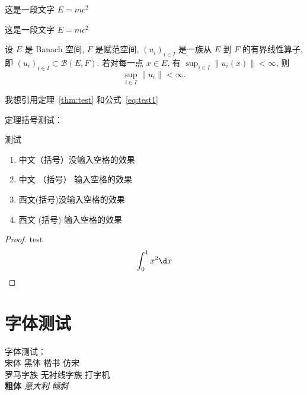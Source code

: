 \documentclass[class = professional, oneside]{gdufe_master_thesis}
\begin{document}
\begin{lemm}
    这是一段文字 $E = m c^2$
\end{lemm}


\begin{rema}
    这是一段文字 $E = m c^2$
\end{rema}

\begin{theo}\label{thm:test}
    设 $E$ 是 Banach 空间, $F$ 是赋范空间, $(u_i)_{i\in I}$ 是一族从 $E$ 到 $F$ 的有界线性算子,
    即 $(u_i)_{i\in I}\subset \mathcal{B}(E,F)$. 若对每一点 $x\in E$, 有
    $\sup_{i\in I} \|u_i(x)\|<\infty$, 则
    \begin{equation}\label{eq:test1}
        \sup_{i\in I} \|u_i\| < \infty.
    \end{equation}
\end{theo}

我想引用定理~\ref{thm:test} 和公式~\ref{eq:test1}


定理括号测试：

\begin{theo}
    测试
    \begin{enumerate}
        \item 中文（括号）没输入空格的效果
        \item 中文 （括号） 输入空格的效果
        \item 西文(括号)没输入空格的效果
        \item 西文 (括号) 输入空格的效果
    \end{enumerate}
\end{theo}


\begin{proof}
    test
    \[
        \int_{0}^{1} x^2 \d x
    \]
\end{proof}



\section{字体测试}
字体测试：\\
{宋体} {\heiti 黑体} {\kaishu 楷书} {\fangsong 仿宋}\\
{\rmfamily 罗马字族} {\sffamily 无衬线字族} {\ttfamily 打字机}\\
{\bfseries 粗体} {\itshape 意大利} {\slshape 倾斜}
\end{document}
